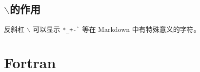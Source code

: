 \section{$\backslash$的作用}
反斜杠 $\backslash$  可以显示 \verb|*_+-`| 等在 Markdown 中有特殊意义的字符。


















\chapter{Fortran}
\begin{comment}
\begin{itemize}
\item 语句并行写\\
 \verb| a=1.0  ;  b=2.0|，即在同一行语句间要加分号（不同行语句间不用）。

\item 语句续行写\\
F90中一行为132列，允许有39个续行。在语句行最后加上续行符“\&”号。如果字符串被打断，跨2行以上，则在续行的开始位置也要加\&号。如：
\begin{verbatim}
inter : : v( 7 , 7 ) , &
         v1( 7 , 7 ) 
和
v1 = reshape( [ 1.0d0 , 0.0d0 , 0.0d0 , 0.0d0 , 0.0d0 , 0.0d0 , 0.0d0 , &
           &   0.0d0 , 0.0d0 , 0.0d0 , 0.0d0 , 0.0d0 , 0.0d0 , 0.0d0 , &
           &   0.0d0 , 0.0d0 , 0.0d0 , 0.0d0 , 0.0d0 , 0.0d0 , 0.0d0 , &
           &   0.0d0 , 0.0d0 , 0.0d0 , 0.0d0 , 0.0d0 , 0.0d0 , 0.0d0 , &
           &   0.0d0 , 0.0d0 , 0.0d0 , 0.0d0 , 0.0d0 , 0.0d0 , 0.0d0 , &
           &   0.0d0 , 0.0d0 , 0.0d0 , 0.0d0 , 0.0d0 , 0.0d0 , 0.0d0 , &
           &    0.0d0 , 0.0d0 , 0.0d0 , 0.0d0 , 0.0d0 , 0.0d0 , 0.0d0 ] , [ 7 , 7] , order=[2,1] )
\end{verbatim}

\item fortran数组的第一个指标是行数，第二个是列数，但在内存中存储是相反的，这个不要混淆了。

\item 矩阵运算函数 \verb|matmul(A,B)|其中\verb|A(7,7),B(7,7)|

\item nint将x转换为整数(四舍五入)。详见：FORTRAN 90标准函数 
\verb|nint(a)|，取a最接近的整数。
\end{itemize}
\end{comment}


